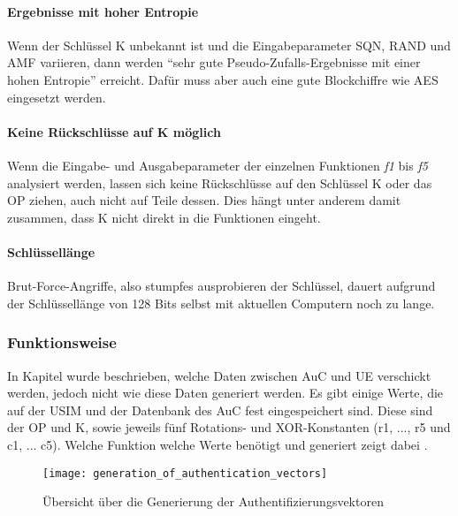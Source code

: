  \paragraph{Ergebnisse mit hoher Entropie}
 Wenn der Schlüssel K unbekannt ist und die Eingabeparameter \ac{SQN}, RAND
 und \ac{AMF} variieren, dann werden ``sehr gute Pseudo-Zufalls-Ergebnisse mit einer hohen
 Entropie'' \cite{spitz11} erreicht. Dafür muss aber auch eine gute Blockchiffre wie AES
 eingesetzt werden.
 
 \paragraph{Keine Rückschlüsse auf K möglich}
 Wenn die Eingabe- und Ausgabeparameter der einzelnen Funktionen \emph{f1} bis \emph{f5}
 analysiert werden, lassen sich keine Rückschlüsse auf den Schlüssel K oder das \acf{OP}
 ziehen, auch nicht auf Teile dessen. Dies hängt unter anderem damit zusammen, dass K nicht
 direkt in die Funktionen eingeht.
 
 \paragraph{Schlüssellänge}
 Brut-Force-Angriffe, also stumpfes ausprobieren der Schlüssel, dauert aufgrund der
 Schlüssellänge von 128 Bits selbst mit aktuellen Computern noch zu lange.
 

 \subsubsection{Funktionsweise}
 \label{milenage-funktion}
 In Kapitel  wurde beschrieben, welche Daten zwischen
 \ac{AuC} und \ac{UE} verschickt werden, jedoch nicht wie diese Daten generiert werden. Es
 gibt einige Werte, die auf der \ac{USIM} und der Datenbank des \ac{AuC} fest eingespeichert
 sind. Diese sind der \ac{OP} und K, sowie jeweils fünf Rotations- und XOR-Konstanten
 (r1, ..., r5 und c1, ... c5). Welche Funktion welche Werte benötigt und generiert zeigt dabei .
 
 \begin{figure}[htp]
  \begin{center}
   \texttt{[image: generation\_of\_authentication\_vectors]}
  \end{center}
  \caption[Übersicht über die Generierung der Authentifizierungsvektoren]{Übersicht über die Generierung der Authentifizierungsvektoren \cite{3gpp.33.102}}
  \label{fig:funktionsubersicht}
 \end{figure}
 
